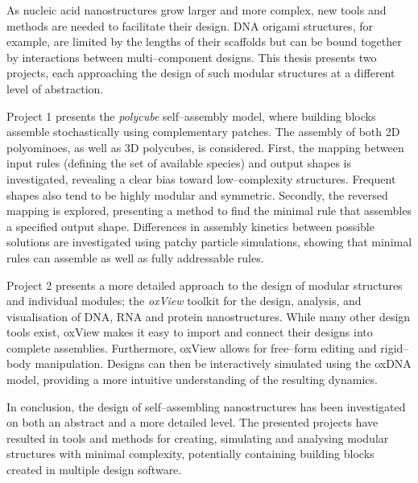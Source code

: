
As nucleic acid nanostructures grow larger and more complex, new tools and methods are needed to facilitate their design. DNA origami structures, for example, are limited by the lengths of their scaffolds but can be bound together by interactions between multi--component designs. This thesis presents two projects, each approaching the design of such modular structures at a different level of abstraction.

Project 1 presents the \emph{polycube} self--assembly model, where building blocks assemble stochastically using complementary patches. The assembly of both 2D polyominoes, as well as 3D polycubes, is considered. First, the mapping between input rules (defining the set of available species) and output shapes is investigated, revealing a clear bias toward low--complexity structures. Frequent shapes also tend to be highly modular and symmetric. Secondly, the reversed mapping is explored, presenting a method to find the minimal rule that assembles a specified output shape. Differences in assembly kinetics between possible solutions are investigated using patchy particle simulations, showing that minimal rules can assemble as well as fully addressable rules.

Project 2 presents a more detailed approach to the design of modular structures and individual modules; the \emph{oxView} toolkit for the design, analysis, and visualisation of DNA, RNA and protein nanostructures. While many other design tools exist, oxView makes it easy to import and connect their designs into complete assemblies. Furthermore, oxView allows for free--form editing and rigid--body manipulation. Designs can then be interactively simulated using the oxDNA model, providing a more intuitive understanding of the resulting dynamics.

In conclusion, the design of self--assembling nanostructures has been investigated on both an abstract and a more detailed level. The presented projects have resulted in tools and methods for creating, simulating and analysing modular structures with minimal complexity, potentially containing building blocks created in multiple design software.